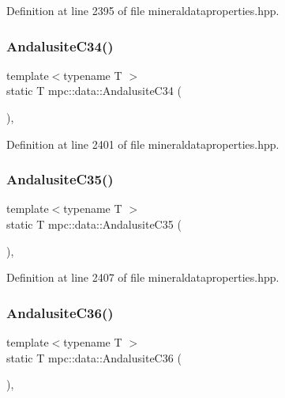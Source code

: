 Definition at line 2395 of file mineraldataproperties.\+hpp.

\mbox{\label{namespacempc_1_1data_a0181878142d5e3fac6daa73cd1a5a861}} 
\subsubsection{\texorpdfstring{Andalusite\+C34()}{AndalusiteC34()}}
{\footnotesize\ttfamily template$<$typename T $>$ \\
static T mpc\+::data\+::\+Andalusite\+C34 (\begin{DoxyParamCaption}{ }\end{DoxyParamCaption})\hspace{0.3cm}{\ttfamily [inline]}, {\ttfamily [static]}}



Definition at line 2401 of file mineraldataproperties.\+hpp.

\mbox{\label{namespacempc_1_1data_aa350303d961c189691a5e212fa07b205}} 
\subsubsection{\texorpdfstring{Andalusite\+C35()}{AndalusiteC35()}}
{\footnotesize\ttfamily template$<$typename T $>$ \\
static T mpc\+::data\+::\+Andalusite\+C35 (\begin{DoxyParamCaption}{ }\end{DoxyParamCaption})\hspace{0.3cm}{\ttfamily [inline]}, {\ttfamily [static]}}



Definition at line 2407 of file mineraldataproperties.\+hpp.

\mbox{\label{namespacempc_1_1data_a43a831f6cac70142d831679a858ce72b}} 
\subsubsection{\texorpdfstring{Andalusite\+C36()}{AndalusiteC36()}}
{\footnotesize\ttfamily template$<$typename T $>$ \\
static T mpc\+::data\+::\+Andalusite\+C36 (\begin{DoxyParamCaption}{ }\end{DoxyParamCaption})\hspace{0.3cm}{\ttfamily [inline]}, {\ttfamily [static]}}



